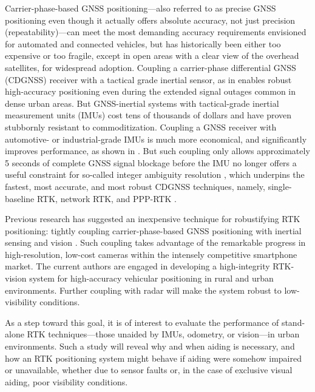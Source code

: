 \documentclass[10pt,journal,twocolumn]{IEEEtran} %
\begin{document}
Carrier-phase-based GNSS positioning---also referred to as precise GNSS
positioning even though it actually offers absolute accuracy, not just
precision (repeatability)---can meet the most demanding accuracy requirements
envisioned for automated and connected vehicles, but has historically been
either too expensive or too fragile, except in open areas with a clear view of
the overhead satellites, for widespread adoption.  Coupling a carrier-phase
differential GNSS (CDGNSS) receiver with a tactical grade inertial sensor, as
in \cite{petovello2004benefits,scherzinger2006precise,
  zhangComparisonWithTactical2006,kennedy2006architecture} enables robust
high-accuracy positioning even during the extended signal outages common in
dense urban areas.  But GNSS-inertial systems with tactical-grade inertial
measurement units (IMUs) cost tens of thousands of dollars and have proven
stubbornly resistant to commoditization.  Coupling a GNSS receiver with
automotive- or industrial-grade IMUs is much more economical, and
significantly improves performance, as shown in \cite{li2018high}.  But such
coupling only allows approximately 5 seconds of complete GNSS signal blockage
before the IMU no longer offers a useful constraint for so-called integer
ambiguity resolution \cite{evaluationLowCostMems2006Godha}, which underpins
the fastest, most accurate, and most robust CDGNSS techniques, namely,
single-baseline RTK, network RTK, and PPP-RTK
\cite{teunissen2015review,cui2017rtkforCAV}.

Previous research has suggested an inexpensive technique for robustifying RTK
positioning: tightly coupling carrier-phase-based GNSS positioning with
inertial sensing and vision \cite{shepard2014fusion,pesyna2015dissertation}.
Such coupling takes advantage of the remarkable progress in high-resolution,
low-cost cameras within the intensely competitive smartphone market.  The
current authors are engaged in developing a high-integrity RTK-vision system
for high-accuracy vehicular positioning in rural and urban environments.
Further coupling with radar will make the system robust to low-visibility
conditions.

As a step toward this goal, it is of interest to evaluate the performance of
stand-alone RTK techniques---those unaided by IMUs, odometry, or vision---in
urban environments.  Such a study will reveal why and when aiding is
necessary, and how an RTK positioning system might behave if aiding were
somehow impaired or unavailable, whether due to sensor faults or, in the case
of exclusive visual aiding, poor visibility conditions.
\end{document}
